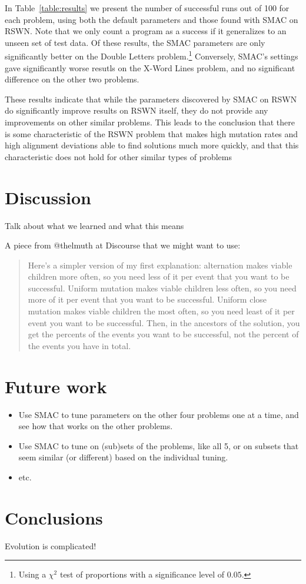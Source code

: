 In Table~\ref{table:results} we present the number of successful runs out of 100 for each problem, using both the default parameters and those found with SMAC on RSWN. Note that we only count a program as a success if it generalizes to an unseen set of test data. Of these results, the SMAC parameters are only significantly better on the Double Letters problem.\footnote{Using a $\chi^2$ test of proportions with a significance level of $0.05$.} 
Conversely, SMAC's settings gave significantly worse resutls on the X-Word Lines problem, and no significant difference on the other two problems.

These results indicate that while the parameters discovered by SMAC on RSWN do significantly improve results on RSWN itself, they do not provide any improvements on other similar problems. This leads to the conclusion that there is some characteristic of the RSWN problem that makes high mutation rates and high alignment deviations able to find solutions much more quickly, and that this characteristic does not hold for other similar types of problems


\section{Discussion}
\label{sec:discussion}

Talk about what we learned and what this means

A piece from @thelmuth at Discourse that we might want to use:
\begin{quote}
	Here's a simpler version of my first explanation: alternation makes viable children more often, so you need less of it per event that you want to be successful. Uniform mutation makes viable children less often, so you need more of it per event that you want to be successful. Uniform close mutation makes viable children the most often, so you need least of it per event you want to be successful. Then, in the ancestors of the solution, you get the percents of the events you want to be successful, not the percent of the events you have in total.
\end{quote}

\section{Future work}
\label{sec:futureWork}

\begin{itemize}
	\item Use SMAC to tune parameters on the other four problems one at a time, and see how that works on the other problems.
	\item Use SMAC to tune on (sub)sets of the problems, like all 5, or on subsets that seem similar (or different) based on the individual tuning.
	\item etc.
\end{itemize}

\section{Conclusions}
\label{sec:conclusion}

Evolution is complicated!

